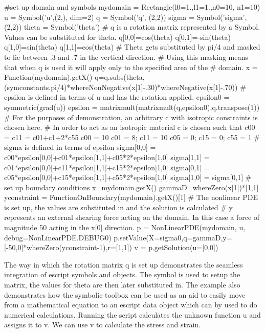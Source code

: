 \begin{python}
#set up domain and symbols
mydomain = Rectangle(l0=1.,l1=1.,n0=10, n1=10)
u = Symbol('u',(2,), dim=2)
q = Symbol('q', (2,2))
sigma = Symbol('sigma',(2,2))
theta = Symbol('theta')
# q is a rotation matrix represented by a Symbol. Values can be substituted for theta.
q[0,0]=cos(theta)
q[0,1]=-sin(theta)
q[1,0]=sin(theta)
q[1,1]=cos(theta)
# Theta gets substituted by pi/4 and masked to lie between .3 and .7 in the vertical direction. 
# Using this masking means that when q is used it will apply only to the specified area of the
# domain. 
x = Function(mydomain).getX()
q=q.subs(theta,(symconstants.pi/4)*whereNonNegative(x[1]-.30)*whereNegative(x[1]-.70))
# epsilon is defined in terms of u and has the rotation applied. 
epsilon0 = symmetric(grad(u))
epsilon = matrixmult(matrixmult(q,epsilon0),q.transpose(1))
# For the purposes of demonstration, an arbitrary c with isotropic constraints is chosen here.
# In order to act as an isotropic material c is chosen such that c00 = c11 = c01+c1+2*c55
c00 = 10
c01 = 8; c11 = 10
c05 = 0; c15 = 0; c55 = 1
# sigma is defined in terms of epsilon
sigma[0,0] = c00*epsilon[0,0]+c01*epsilon[1,1]+c05*2*epsilon[1,0]
sigma[1,1] = c01*epsilon[0,0]+c11*epsilon[1,1]+c15*2*epsilon[1,0]
sigma[0,1] = c05*epsilon[0,0]+c15*epsilon[1,1]+c55*2*epsilon[1,0]
sigma[1,0] = sigma[0,1]
# set up boundary conditions
x=mydomain.getX()
gammaD=whereZero(x[1])*[1,1]
yconstraint = FunctionOnBoundary(mydomain).getX()[1]
# The nonlinear PDE is set up, the values are substituted in and the solution is calculated
# y represents an external shearing force acting on the domain. In this case a force of magnitude 50 acting in the x[0] direction.
p = NonLinearPDE(mydomain, u, debug=NonLinearPDE.DEBUG0)
p.setValue(X=sigma0,q=gammaD,y=[-50,0]*whereZero(yconstraint-1),r=[1,1])
v = p.getSolution(u=[0,0])
\end{python}
The way in which the rotation matrix q is set up demonstrates the seamless integration of escript symbols and \Data objects. The symbol is used to setup the matrix, the values for theta are then later substituted in. The example also demonstrates how the symbolic toolbox can be used as an aid to easily move from a mathematical equation to an escript data object which can by used to do numerical calculations. 
Running the script calculates the unknown function u and assigns it to v. We can use v to calculate the stress and strain.  
